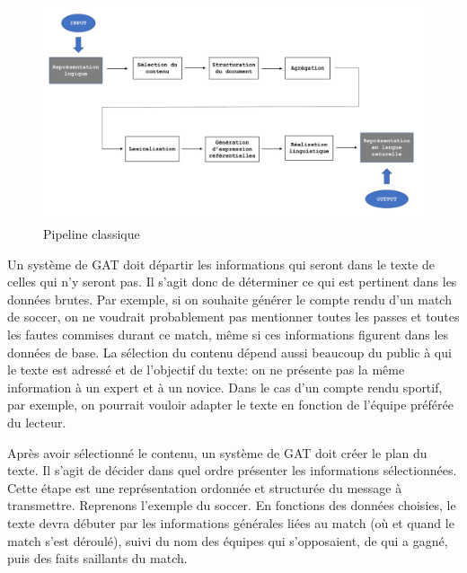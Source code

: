 \begin{figure}[htb] %
	\centering
	\includegraphics[width=1\textwidth, trim = {0cm 0cm 0cm 0cm},clip]{ch2/figs/pipeline.pdf}
	\caption{Pipeline classique}
	\label{fig:Pipeline}
\end{figure}


Un système de \ac{GAT} doit départir les informations qui seront dans le texte de celles qui n'y seront pas. Il s'agit donc de déterminer ce qui est pertinent dans les données brutes. Par exemple, si on souhaite générer le compte rendu d'un match de soccer, on ne voudrait probablement pas mentionner toutes les passes et toutes les fautes commises durant ce match, même si ces informations figurent dans les données de base. La sélection du contenu dépend aussi beaucoup du public à qui le texte est adressé et de l'objectif du texte: on ne présente pas la même information à un expert et à un novice. Dans le cas d'un compte rendu sportif, par exemple, on pourrait vouloir adapter le texte en fonction de l'équipe préférée du lecteur.

Après avoir sélectionné le contenu, un système de \ac{GAT} doit créer le plan du texte. Il s'agit de décider dans quel ordre présenter les informations sélectionnées. Cette étape est une représentation ordonnée et structurée du message à transmettre. Reprenons l'exemple du soccer. En fonctions des données choisies, le texte devra débuter par les informations générales liées au match (où et quand le match s'est déroulé), suivi du nom des équipes qui s'opposaient, de qui a gagné, puis des faits saillants du match.

